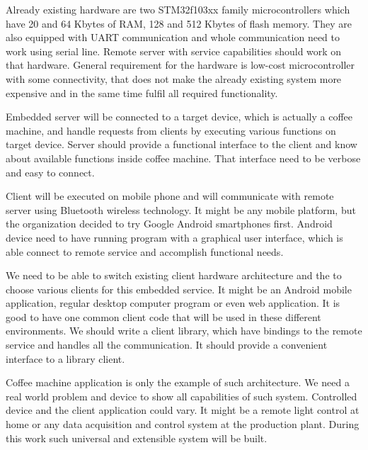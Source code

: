 Already existing hardware are two STM32f103xx family microcontrollers which have
20 and 64 Kbytes of \gls{RAM}, 128 and 512 Kbytes of flash memory. They are also
equipped with \gls{UART} communication and whole communication need to work using
serial line. Remote server with service capabilities should work on that
hardware. General requirement for the hardware is low-cost microcontroller with
some connectivity, that does not make the  already existing system more
expensive and in the same time fulfil all required functionality.

Embedded server will be connected to a target device, which is actually a coffee
machine, and handle requests from clients by executing various functions on
target device.
Server should provide a functional interface to the client and know about
available functions inside coffee machine. That interface need to be verbose and
easy to connect. 

Client will be executed on mobile phone and will communicate with remote server
using Bluetooth wireless technology. It might be any mobile platform, but
the organization decided to try Google Android smartphones first. 
Android device need to have running program with a graphical user interface,
which is able connect to remote service and accomplish functional needs.

We need to be able to switch existing client hardware architecture and the to
choose various clients for this embedded service. It might be an Android mobile
application, regular desktop computer program or even web application.
It is good to have one common client code that will be used in these different
environments. We should write a client library, which have bindings to the
remote service and handles all the communication. It should provide a
convenient interface to a library client.

Coffee machine application is only the example of such architecture.
We need a real world problem and device to show all capabilities of such system.
Controlled device and the client application could vary. It might be a
remote light control at home or any data acquisition and control system at the
production plant. During this work such universal and extensible system will be
built.

